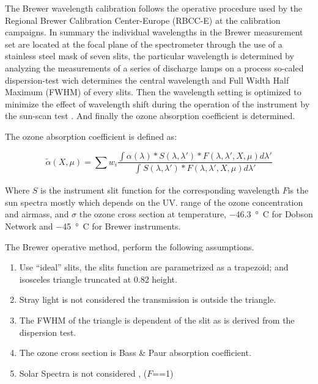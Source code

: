 \documentclass[acp]{copernicus} %
\begin{document}

The Brewer wavelength calibration follows the operative procedure \citep{Grobner1998, kerr2002new} used by the Regional Brewer Calibration Center-Europe (RBCC-E) at the calibration campaigns. In summary the individual wavelengths in the Brewer measurement set are located at the focal plane of the spectrometer through the use of a stainless steel mask of seven slits, the particular wavelength is determined by analyzing the measurements of  a series of discharge lamps on a process so-caled dispersion-test wich determines the central wavelength and Full Width Half Maximum (FWHM) of every slits. Then the  wavelength setting is optimized to minimize the effect of wavelength shift during the operation of the instrument by the sun-scan test \citep{sun_scan_ios}. And finally the ozone absorption coefficient is determined.   


The  ozone absorption coefficient is defined as:

\begin{equation}
\widetilde \alpha (X,\mu ) = \sum {{w_i}} \frac{{\int {\alpha (\lambda )*S(\lambda ,\lambda ')*} F(\lambda ,\lambda ',X,\mu )d\lambda '}}{{\int_{}^{} {S(\lambda ,\lambda ')*F(\lambda ,\lambda ',X,\mu )d\lambda '} }}
\end{equation}

Where $S$ is the instrument slit function for the corresponding wavelength  $F$is the sun spectra mostly which depends on the UV. range of the ozone concentration and airmass, and $\sigma$ the ozone cross section at  temperature, $-$46.3\, \unit{\degree C} for Dobson Network
and $-$45\, \unit{\degree C} for Brewer instruments. 

The Brewer operative method, perform the following assumptions.
\begin{enumerate}
	\item Use  “ideal” slits,  the slits function are parametrized as a trapezoid; and isosceles triangle truncated at 0.82 height.
	\item Stray light is not considered the transmission is outside the triangle. 
	\item The FWHM of the triangle is dependent of the slit as is derived from the dispersion test.
	\item The ozone cross section  is Bass \& Paur absorption coefficient.
 	\item Solar Spectra is not considered ,  ($F$==1)
\end{enumerate}
\end{document}
